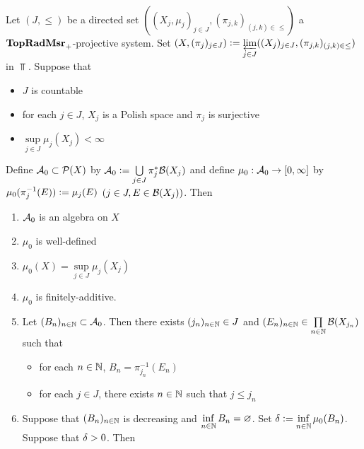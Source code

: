 \documentclass{book}
\begin{document}

\begin{ex} \lex{}  \\
	Let $(J, {\leq})$ be a directed set $((X_j, \mu_j)_{j \in J}, (\pi_{j,k})_{(j,k) \in {\leq}})$ a $\operatorname*{\text{\textbf{TopRadMsr}}_{+}}$-projective system. Set $(X, (\pi_j)_{j \in J}) \vcentcolon= \varprojlim\limits_{j \in J} ((X_j)_{j \in J}, (\pi_{j,k})_{(j,k) \in {\leq}})$ in $\Top$. Suppose that 
	\begin{itemize}
		\item $J$ is countable
		\item for each $j \in J$, $X_j$ is a Polish space and $\pi_j$ is surjective
		\item $\sup\limits_{j \in J} \mu_j(X_j) < \infty$ 
	\end{itemize}
	Define $\mathcal{A}_0 \subset \mathcal{P}(X)$ by $\mathcal{A}_0 \vcentcolon= \bigcup\limits_{j \in J} \pi_j^*\mathcal{B}(X_j)$ and define $\mu_0: \mathcal{A}_0 \rightarrow [0,\infty]$ by $\mu_0(\pi_j^{-1}(E)) \vcentcolon= \mu_j(E)$ $(j \in J, E \in \mathcal{B}(X_j))$. Then
	\begin{enumerate}
		\item $\mathcal{A}_0$ is an algebra on $X$
		\item $\mu_0$ is well-defined
		\item $\mu_0(X) = \sup\limits_{j \in J} \mu_j(X_j)$
		\item $\mu_0$ is finitely-additive.
		\item Let $(B_n)_{n \in \mathbb{N}} \subset \mathcal{A}_0$. Then there exists $(j_n)_{n \in \mathbb{N}} \in J$ and $(E_n)_{n \in \mathbb{N}} \in \prod\limits_{n \in \mathbb{N}} \mathcal{B}(X_{j_n})$ such that 
		\begin{itemize}
			\item for each $n \in \mathbb{N}$, $B_n = \pi_{j_n}^{-1}(E_n)$ 
			\item for each $j \in J$, there exists $n \in \mathbb{N}$ such that $j \leq j_n$
		\end{itemize}
		\item Suppose that $(B_n)_{n \in \mathbb{N}}$ is decreasing and $\inf\limits_{n \in \mathbb{N}} B_n = \varnothing$. Set $\delta \vcentcolon= \inf\limits_{n \in \mathbb{N}} \mu_0(B_n)$. Suppose that $\delta > 0$. Then 
		\begin{enumerate}

\end{enumerate}
\end{enumerate}
\end{ex}
\end{document}
